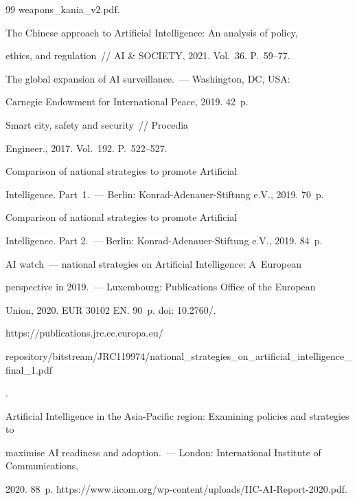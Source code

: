 {{\begin{thebibliography}{99}
{weapons\_kania\_v2.pdf}.






The Chinese approach to Artificial Intelligence: An analysis of policy, 


ethics, and regulation~/\!\!/ AI \& SOCIETY, 2021. Vol.~36. P.~59--77.




 The global expansion of AI surveillance.~--- Washington, DC, USA: 


Carnegie Endowment for International Peace, 2019. 42~p.




 Smart city, safety and security~/\!\!/ Procedia 


Engineer., 2017. Vol.~192. P.~522--527.




 Comparison of national strategies to promote Artificial 


Intelligence. Part~1.~--- Berlin: Konrad-Adenauer-Stiftung e.V., 2019. 70~p.




 Comparison of national strategies to promote Artificial 


Intelligence. Part 2.~--- Berlin: Konrad-Adenauer-Stiftung e.V., 2019. 84~p.




 AI watch~--- national strategies on Artificial Intelligence: A~European 


perspective in 2019.~--- Luxembourg: Publications Office of the European 


Union, 2020.  EUR 30102 EN. 90~p. doi: 10.2760\!/.


{\sf https://publications.jrc.ec.europa.eu/\linebreak 


repository/bitstream/JRC119974/national\_strategies\_on\_artificial\_intelligence\_final\_1.\linebreak pdf}.




Artificial Intelligence in the Asia-Pacific region: Examining policies and strategies to 


maximise AI readiness and adoption.~--- London: International Institute of Communications, 


2020. 88~p. {\sf https://www.iicom.org/wp-content/uploads/IIC-AI-Report-2020.pdf}.


       \end{thebibliography}


} }











